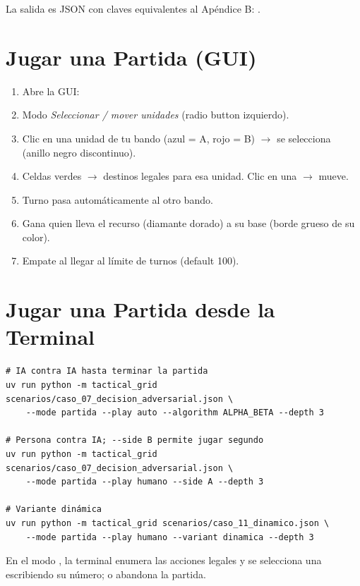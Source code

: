 La salida es JSON con claves equivalentes al Apéndice B:
.

\section{Jugar una Partida (GUI)}
\label{sec:jugar-gui}

\begin{enumerate}
\item Abre la GUI: 
\item Modo \textit{Seleccionar / mover unidades} (radio button izquierdo).
\item Clic en una unidad de tu bando (azul = A, rojo = B) $\to$ se selecciona (anillo negro discontinuo).
\item Celdas verdes $\to$ destinos legales para esa unidad. Clic en una $\to$ mueve.
\item Turno pasa automáticamente al otro bando.
\item Gana quien lleva el recurso (diamante dorado) a su base (borde grueso de su color).
\item Empate al llegar al límite de turnos (default 100).
\end{enumerate}

\section{Jugar una Partida desde la Terminal}
\label{sec:partida-cli-rapida}

\begin{verbatim}
# IA contra IA hasta terminar la partida
uv run python -m tactical_grid scenarios/caso_07_decision_adversarial.json \
    --mode partida --play auto --algorithm ALPHA_BETA --depth 3

# Persona contra IA; --side B permite jugar segundo
uv run python -m tactical_grid scenarios/caso_07_decision_adversarial.json \
    --mode partida --play humano --side A --depth 3

# Variante dinámica
uv run python -m tactical_grid scenarios/caso_11_dinamico.json \
    --mode partida --play humano --variant dinamica --depth 3
\end{verbatim}

En el modo \code{humano}, la terminal enumera las acciones legales y se selecciona una
escribiendo su número;  o  abandona la partida.

